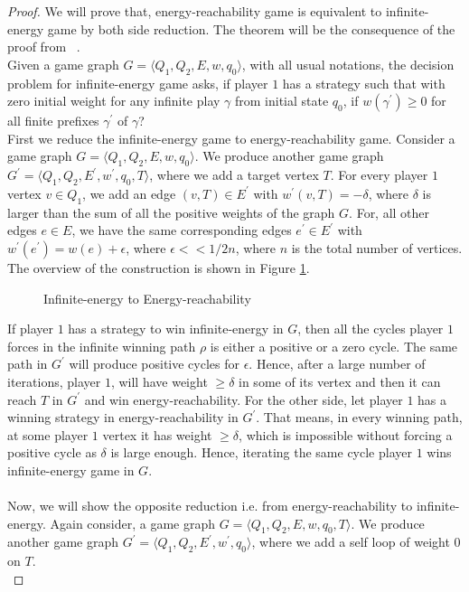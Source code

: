 \begin{proof}
We will prove that, energy-reachability game is equivalent to infinite-energy game by both side reduction. The theorem will be the consequence of the proof from ~\cite{DBLP:conf/formats/BouyerFLMS08}.\\

Given a game graph $G=\langle Q_1, Q_2, E, w, q_0\rangle$, with all usual notations, the decision problem for infinite-energy game asks, if player $1$ has a strategy such that with zero initial weight for any infinite play $\gamma$ from initial state $q_0$, if $w(\gamma^{\prime}) \geq 0$ for all finite prefixes $\gamma^{\prime}$ of $\gamma$? \\
First we reduce the infinite-energy game to energy-reachability game.
Consider a game graph $G=\langle Q_1, Q_2, E, w, q_0\rangle$. We produce another game graph $G^{\prime}=\langle Q_1, Q_2, E^{\prime}, w^{\prime}, q_0,T\rangle$, where we add a target vertex $T$. For every player $1$ vertex $v \in Q_1$, we add an edge $(v,T) \in E^{\prime}$ with $w^{\prime}(v,T) = -\delta$, where $\delta$ is larger than the sum of all the positive weights of the graph $G$. For, all other edges $e \in E$, we have the same corresponding edges $e^{\prime} \in E^{\prime}$ with $w^{\prime}(e^{\prime})= w(e)+ \epsilon$, where $\epsilon << 1/2n$, where $n$ is the total number of vertices. The overview of the construction is shown in Figure \ref{inf-reach}.
\begin{figure}
    \label{inf-reach}
    \centering
    
    \caption{Infinite-energy to Energy-reachability}
\end{figure}

If player $1$ has a strategy to win infinite-energy in $G$, then all the cycles player $1$ forces in the infinite winning path $\rho$ is either a positive or a zero cycle. The same path in $G^{\prime}$ will produce positive cycles for $\epsilon$. Hence, after a large number of iterations, player $1$, will have weight $\geq \delta$ in some of its vertex and then it can reach $T$ in $G^{\prime}$ and win energy-reachability. For the other side, let player $1$ has a winning strategy in energy-reachability in $G^{\prime}$. That means, in every winning path, at some player $1$ vertex it has weight $\geq \delta$, which is impossible without forcing a positive cycle as $\delta$ is large enough. Hence, iterating the same cycle player $1$ wins infinite-energy game in $G$.\\
\\
Now, we will show the opposite reduction i.e. from energy-reachability to infinite-energy. Again consider, a game graph $G=\langle Q_1, Q_2, E, w, q_0, T\rangle$. We produce another game graph $G^{\prime}=\langle Q_1, Q_2, E^{\prime}, w^{\prime}, q_0\rangle$, where we add a self loop of weight $0$ on $T$.\\
\huge{}
\end{proof}


